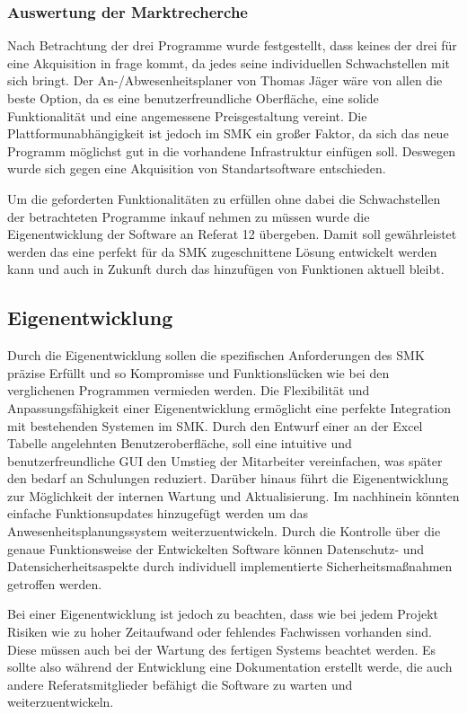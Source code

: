 \subsubsection{Auswertung der Marktrecherche}
\label{sec:AuswertungMarktrecherche}
Nach Betrachtung der drei Programme wurde festgestellt, dass keines der drei für eine Akquisition in frage kommt, da jedes seine individuellen Schwachstellen mit sich bringt. Der An-/Abwesenheitsplaner von Thomas Jäger wäre von allen die beste Option, da es eine benutzerfreundliche Oberfläche, eine solide Funktionalität und eine angemessene Preisgestaltung vereint. Die Plattformunabhängigkeit ist jedoch im SMK ein großer Faktor, da sich das neue Programm möglichst gut in die vorhandene Infrastruktur einfügen soll. Deswegen wurde sich gegen eine Akquisition von Standartsoftware entschieden.

Um die geforderten Funktionalitäten zu erfüllen ohne dabei die Schwachstellen der betrachteten Programme inkauf nehmen zu müssen wurde die Eigenentwicklung der Software an Referat 12 übergeben. Damit soll gewährleistet werden das eine perfekt für da SMK zugeschnittene Lösung entwickelt werden kann und auch in Zukunft durch das hinzufügen von Funktionen aktuell bleibt.

\subsection{Eigenentwicklung}
\label{sec:Eigenentwicklung}

Durch die Eigenentwicklung sollen die spezifischen Anforderungen des SMK präzise Erfüllt und so Kompromisse und Funktionslücken wie bei den verglichenen Programmen vermieden werden. Die Flexibilität und Anpassungsfähigkeit einer Eigenentwicklung ermöglicht eine perfekte Integration mit bestehenden Systemen im SMK. Durch den Entwurf einer an der Excel Tabelle angelehnten Benutzeroberfläche, soll eine intuitive und benutzerfreundliche GUI den Umstieg der Mitarbeiter vereinfachen, was später den bedarf an Schulungen reduziert. Darüber hinaus führt die Eigenentwicklung zur Möglichkeit der internen Wartung und Aktualisierung. Im nachhinein könnten einfache Funktionsupdates hinzugefügt werden um das Anwesenheitsplanungssystem weiterzuentwickeln. Durch die Kontrolle über die genaue Funktionsweise der Entwickelten Software können Datenschutz- und Datensicherheitsaspekte durch individuell implementierte Sicherheitsmaßnahmen getroffen werden.

Bei einer Eigenentwicklung ist jedoch zu beachten, dass wie bei jedem Projekt Risiken wie zu hoher Zeitaufwand oder fehlendes Fachwissen vorhanden sind. Diese müssen auch bei der Wartung des fertigen Systems beachtet werden. Es sollte also während der Entwicklung eine Dokumentation erstellt werde, die auch andere Referatsmitglieder befähigt die Software zu warten und \ggfs weiterzuentwickeln.


